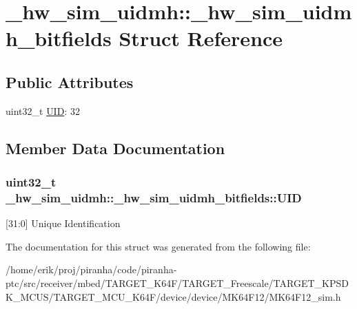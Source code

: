 \hypertarget{struct__hw__sim__uidmh_1_1__hw__sim__uidmh__bitfields}{}\section{\+\_\+hw\+\_\+sim\+\_\+uidmh\+:\+:\+\_\+hw\+\_\+sim\+\_\+uidmh\+\_\+bitfields Struct Reference}
\label{struct__hw__sim__uidmh_1_1__hw__sim__uidmh__bitfields}
\subsection*{Public Attributes}
\begin{DoxyCompactItemize}
\item 
uint32\+\_\+t \hyperlink{struct__hw__sim__uidmh_1_1__hw__sim__uidmh__bitfields_ab5880c4ca55024bf369ce9aea46bfbec}{U\+ID}\+: 32
\end{DoxyCompactItemize}


\subsection{Member Data Documentation}
\subsubsection[{\texorpdfstring{U\+ID}{UID}}]{\setlength{\rightskip}{0pt plus 5cm}uint32\+\_\+t \+\_\+hw\+\_\+sim\+\_\+uidmh\+::\+\_\+hw\+\_\+sim\+\_\+uidmh\+\_\+bitfields\+::\+U\+ID}\hypertarget{struct__hw__sim__uidmh_1_1__hw__sim__uidmh__bitfields_ab5880c4ca55024bf369ce9aea46bfbec}{}\label{struct__hw__sim__uidmh_1_1__hw__sim__uidmh__bitfields_ab5880c4ca55024bf369ce9aea46bfbec}
\mbox{[}31\+:0\mbox{]} Unique Identification 

The documentation for this struct was generated from the following file\+:\begin{DoxyCompactItemize}
\item 
/home/erik/proj/piranha/code/piranha-\/ptc/src/receiver/mbed/\+T\+A\+R\+G\+E\+T\+\_\+\+K64\+F/\+T\+A\+R\+G\+E\+T\+\_\+\+Freescale/\+T\+A\+R\+G\+E\+T\+\_\+\+K\+P\+S\+D\+K\+\_\+\+M\+C\+U\+S/\+T\+A\+R\+G\+E\+T\+\_\+\+M\+C\+U\+\_\+\+K64\+F/device/device/\+M\+K64\+F12/M\+K64\+F12\+\_\+sim.\+h\end{DoxyCompactItemize}
